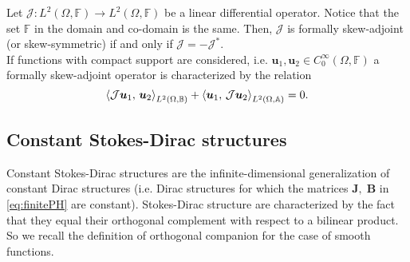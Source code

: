 \begin{definition}
	\label{def:skewoper}
	Let $\mathcal{J}: L^2(\Omega, \mathbb{F}) \rightarrow L^2(\Omega, \mathbb{F})$ be a linear differential operator. Notice that the set $\mathbb{F}$ in the domain and co-domain is the same. Then, $\mathcal{J}$ is formally skew-adjoint (or skew-symmetric) if and only if $\mathcal{J} = -\mathcal{J}^*$. \\
	
	If functions with compact support are considered, i.e. $\bm{u}_1, \bm{u}_2 \in  C^{\infty}_0(\Omega, \mathbb{F})$ a formally skew-adjoint operator is characterized by the relation 
	\begin{equation}
	\inner[L^2(\Omega, \bbB)]{\mathcal{J}\bm{u}_1}{\bm{u}_2} + \inner[L^2(\Omega, \bbA)]{\bm{u}_1}{\mathcal{J}\bm{u}_2} = 0.
	\end{equation}{}
\end{definition}

\subsection{Constant Stokes-Dirac structures}

Constant Stokes-Dirac structures are the infinite-dimensional generalization of constant Dirac structures (i.e. Dirac structures for which the matrices $\mathbf{J}, \; \mathbf{B}$ in \eqref{eq:finitePH} are constant). Stokes-Dirac structure are characterized by the fact that they  equal their orthogonal complement with respect to a bilinear product. So we recall the definition of orthogonal companion for the case of smooth functions.

